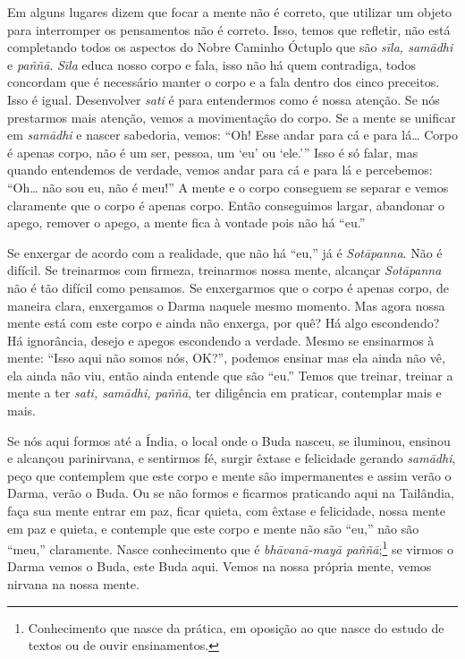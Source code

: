 Em alguns lugares dizem que focar a mente não é correto, que
utilizar um objeto para interromper os pensamentos não é correto. Isso,
temos que refletir, não está completando todos os aspectos do Nobre
Caminho Óctuplo que são \emph{sīla, samādhi} e\emph{ paññā}.
\emph{Sīla} educa nosso corpo e fala, isso não há quem contradiga,
todos concordam que é necessário manter o corpo e a fala dentro dos
cinco preceitos. Isso é igual. Desenvolver \emph{sati} é para
entendermos como é nossa atenção. Se nós prestarmos mais atenção, vemos
a movimentação do corpo. Se a mente se unificar em \emph{samādhi} e
nascer sabedoria, vemos: “Oh! Esse andar para cá e para lá\ldots{} Corpo é
apenas corpo, não é um ser, pessoa, um ‘eu’ ou ‘ele.’” Isso é só falar,
mas quando entendemos de verdade, vemos andar para cá e para lá e
percebemos: “Oh\ldots{} não sou eu, não é meu!” A mente e o corpo conseguem se
separar e vemos claramente que o corpo é apenas corpo. Então
conseguimos largar, abandonar o apego, remover o apego, a mente fica à
vontade pois não há “eu.” 

Se enxergar de acordo com a realidade, que não há “eu,” já é
\emph{Sotāpanna}. Não é difícil. Se treinarmos com firmeza,
treinarmos nossa mente, alcançar \emph{Sotāpanna} não é tão difícil
como pensamos. Se enxergarmos que o corpo é apenas corpo, de maneira
clara, enxergamos o Darma naquele mesmo momento. Mas agora nossa mente
está com este corpo e ainda não enxerga, por quê? Há algo escondendo?
Há ignorância, desejo e apegos escondendo a verdade. Mesmo se
ensinarmos à mente: “Isso aqui não somos nós, OK?”, podemos ensinar mas
ela ainda não vê, ela ainda não viu, então ainda entende que são “eu.”
Temos que treinar, treinar a mente a ter \emph{sati, samādhi,
paññā}, ter diligência em praticar, contemplar mais e mais. 

Se nós aqui formos até a Índia, o local onde o Buda nasceu, se
iluminou, ensinou e alcançou parinirvana, e sentirmos fé, surgir êxtase
e felicidade gerando \emph{samādhi}, peço que contemplem que este
corpo e mente são impermanentes e assim verão o Darma, verão o Buda. Ou
se não formos e ficarmos praticando aqui na Tailândia, faça sua mente
entrar em paz, ficar quieta, com êxtase e felicidade, nossa mente em
paz e quieta, e contemple que este corpo e mente não são “eu,” não são
“meu,” claramente. Nasce conhecimento que é \emph{bhāvanā-mayā
paññā};\footnote{Conhecimento que nasce da prática, em oposição ao que
nasce do estudo de textos ou de ouvir ensinamentos.} se virmos o Darma
vemos o Buda, este Buda aqui. Vemos na nossa própria mente, vemos
nirvana na nossa mente. 

